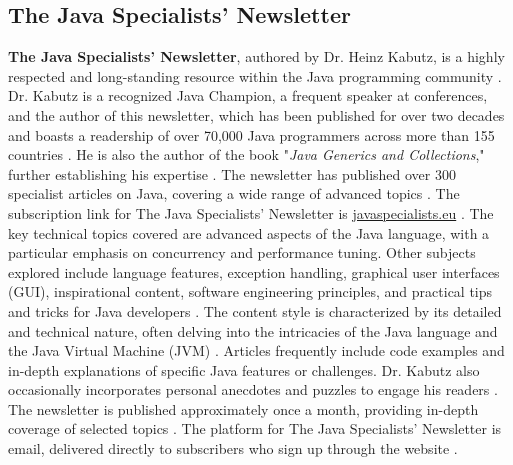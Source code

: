 \documentclass[11pt]{article}
\begin{document}
\subsection{The Java Specialists' Newsletter}
\textbf{The Java Specialists' Newsletter}, authored by Dr. Heinz Kabutz, is a highly respected and long-standing resource within the Java programming community \citep{loggly2025newsletters}. Dr. Kabutz is a recognized Java Champion, a frequent speaker at conferences, and the author of this newsletter, which has been published for over two decades and boasts a readership of over 70,000 Java programmers across more than 155 countries \citep{javaspecialists2025archive}. He is also the author of the book "\textit{Java Generics and Collections}," further establishing his expertise \citep{javaspecialists2025archive}. The newsletter has published over 300 specialist articles on Java, covering a wide range of advanced topics \citep{javaspecialists2025archive}. The subscription link for The Java Specialists' Newsletter is \url{javaspecialists.eu} \citep{loggly2025newsletters}. The key technical topics covered are advanced aspects of the Java language, with a particular emphasis on concurrency and performance tuning. Other subjects explored include language features, exception handling, graphical user interfaces (GUI), inspirational content, software engineering principles, and practical tips and tricks for Java developers \citep{loggly2025newsletters}. The content style is characterized by its detailed and technical nature, often delving into the intricacies of the Java language and the Java Virtual Machine (JVM) \citep{javaspecialists2025archive}. Articles frequently include code examples and in-depth explanations of specific Java features or challenges. Dr. Kabutz also occasionally incorporates personal anecdotes and puzzles to engage his readers \citep{javaspecialists2025archive}. The newsletter is published approximately once a month, providing in-depth coverage of selected topics \citep{loggly2025newsletters}. The platform for The Java Specialists' Newsletter is email, delivered directly to subscribers who sign up through the website \citep{javaspecialists2025archive}.
\end{document}
